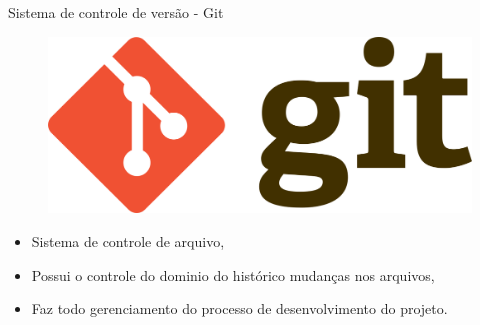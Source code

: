 \documentclass[12pt]{beamer}
\begin{document}
\begin{frame}{Sistema de controle de versão - Git}
	\begin{figure}[!htb]
		\centering
		\includegraphics[scale=0.15]{figuras/git.png} 
		\label{fig:git} %
	\end{figure}
	\begin{itemize}
		\item Sistema de controle de arquivo,
		\item Possui o controle do dominio do histórico mudanças nos arquivos,		
		\item Faz todo gerenciamento do processo de desenvolvimento do projeto.
	\end{itemize}
\end{frame}

\end{document}
